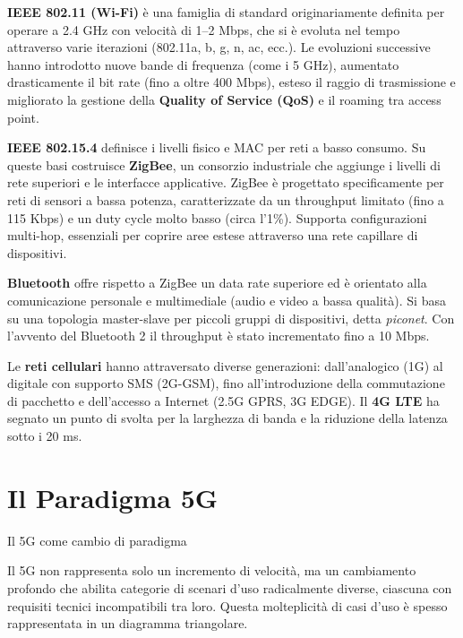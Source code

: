 \documentclass[
  italian,
  openany]{book}
\begin{document}
\textbf{IEEE 802.11 (Wi-Fi)} è una famiglia di standard originariamente
definita per operare a 2.4 GHz con velocità di 1--2 Mbps, che si è
evoluta nel tempo attraverso varie iterazioni (802.11a, b, g, n, ac,
ecc.). Le evoluzioni successive hanno introdotto nuove bande di
frequenza (come i 5 GHz), aumentato drasticamente il bit rate (fino a
oltre 400 Mbps), esteso il raggio di trasmissione e migliorato la
gestione della \textbf{Quality of Service (QoS)} e il roaming tra access
point.

\textbf{IEEE 802.15.4} definisce i livelli fisico e MAC per reti a basso
consumo. Su queste basi costruisce \textbf{ZigBee}, un consorzio
industriale che aggiunge i livelli di rete superiori e le interfacce
applicative. ZigBee è progettato specificamente per reti di sensori a
bassa potenza, caratterizzate da un throughput limitato (fino a 115
Kbps) e un duty cycle molto basso (circa l'1\%). Supporta configurazioni
multi-hop, essenziali per coprire aree estese attraverso una rete
capillare di dispositivi.

\textbf{Bluetooth} offre rispetto a ZigBee un data rate superiore ed è
orientato alla comunicazione personale e multimediale (audio e video a
bassa qualità). Si basa su una topologia master-slave per piccoli gruppi
di dispositivi, detta \emph{piconet}. Con l'avvento del Bluetooth 2 il
throughput è stato incrementato fino a 10 Mbps.

Le \textbf{reti cellulari} hanno attraversato diverse generazioni:
dall'analogico (1G) al digitale con supporto SMS (2G-GSM), fino
all'introduzione della commutazione di pacchetto e dell'accesso a
Internet (2.5G GPRS, 3G EDGE). Il \textbf{4G LTE} ha segnato un punto di
svolta per la larghezza di banda e la riduzione della latenza sotto i 20
ms.

\section{Il Paradigma 5G}\label{il-paradigma-5g}

\begin{callouttip}{Il 5G come cambio di paradigma}

Il 5G non rappresenta solo un incremento di velocità, ma un cambiamento
profondo che abilita categorie di scenari d'uso radicalmente diverse,
ciascuna con requisiti tecnici incompatibili tra loro. Questa
molteplicità di casi d'uso è spesso rappresentata in un diagramma
triangolare.

\end{callouttip}
\end{document}
